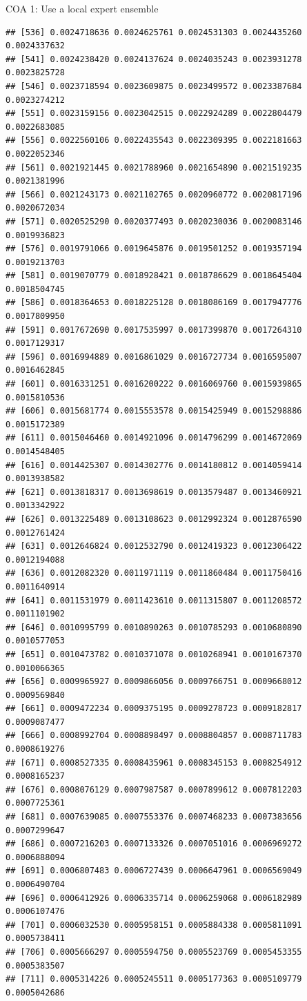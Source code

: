 \documentclass[ignorenonframetext,]{beamer}
\begin{document}
\begin{frame}[fragile]{COA 1: Use a local expert ensemble}
\begin{verbatim}
## [536] 0.0024718636 0.0024625761 0.0024531303 0.0024435260 0.0024337632
## [541] 0.0024238420 0.0024137624 0.0024035243 0.0023931278 0.0023825728
## [546] 0.0023718594 0.0023609875 0.0023499572 0.0023387684 0.0023274212
## [551] 0.0023159156 0.0023042515 0.0022924289 0.0022804479 0.0022683085
## [556] 0.0022560106 0.0022435543 0.0022309395 0.0022181663 0.0022052346
## [561] 0.0021921445 0.0021788960 0.0021654890 0.0021519235 0.0021381996
## [566] 0.0021243173 0.0021102765 0.0020960772 0.0020817196 0.0020672034
## [571] 0.0020525290 0.0020377493 0.0020230036 0.0020083146 0.0019936823
## [576] 0.0019791066 0.0019645876 0.0019501252 0.0019357194 0.0019213703
## [581] 0.0019070779 0.0018928421 0.0018786629 0.0018645404 0.0018504745
## [586] 0.0018364653 0.0018225128 0.0018086169 0.0017947776 0.0017809950
## [591] 0.0017672690 0.0017535997 0.0017399870 0.0017264310 0.0017129317
## [596] 0.0016994889 0.0016861029 0.0016727734 0.0016595007 0.0016462845
## [601] 0.0016331251 0.0016200222 0.0016069760 0.0015939865 0.0015810536
## [606] 0.0015681774 0.0015553578 0.0015425949 0.0015298886 0.0015172389
## [611] 0.0015046460 0.0014921096 0.0014796299 0.0014672069 0.0014548405
## [616] 0.0014425307 0.0014302776 0.0014180812 0.0014059414 0.0013938582
## [621] 0.0013818317 0.0013698619 0.0013579487 0.0013460921 0.0013342922
## [626] 0.0013225489 0.0013108623 0.0012992324 0.0012876590 0.0012761424
## [631] 0.0012646824 0.0012532790 0.0012419323 0.0012306422 0.0012194088
## [636] 0.0012082320 0.0011971119 0.0011860484 0.0011750416 0.0011640914
## [641] 0.0011531979 0.0011423610 0.0011315807 0.0011208572 0.0011101902
## [646] 0.0010995799 0.0010890263 0.0010785293 0.0010680890 0.0010577053
## [651] 0.0010473782 0.0010371078 0.0010268941 0.0010167370 0.0010066365
## [656] 0.0009965927 0.0009866056 0.0009766751 0.0009668012 0.0009569840
## [661] 0.0009472234 0.0009375195 0.0009278723 0.0009182817 0.0009087477
## [666] 0.0008992704 0.0008898497 0.0008804857 0.0008711783 0.0008619276
## [671] 0.0008527335 0.0008435961 0.0008345153 0.0008254912 0.0008165237
## [676] 0.0008076129 0.0007987587 0.0007899612 0.0007812203 0.0007725361
## [681] 0.0007639085 0.0007553376 0.0007468233 0.0007383656 0.0007299647
## [686] 0.0007216203 0.0007133326 0.0007051016 0.0006969272 0.0006888094
## [691] 0.0006807483 0.0006727439 0.0006647961 0.0006569049 0.0006490704
## [696] 0.0006412926 0.0006335714 0.0006259068 0.0006182989 0.0006107476
## [701] 0.0006032530 0.0005958151 0.0005884338 0.0005811091 0.0005738411
## [706] 0.0005666297 0.0005594750 0.0005523769 0.0005453355 0.0005383507
## [711] 0.0005314226 0.0005245511 0.0005177363 0.0005109779 0.0005042686

\end{verbatim}
\end{frame}
\end{document}
